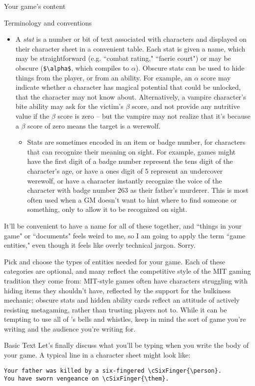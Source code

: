 \documentclass{article}
\begin{document}
\begin{section}{Your game's content}
\begin{subsection}{Terminology and conventions}
\begin{itemize}
\begin{itemize}
\end{itemize}
  \item A \textit{stat} is a number or bit of text associated with characters and displayed on their character sheet in a convenient table.  Each stat is given a name, which may be straightforward (e.g. ``combat rating," ``faerie court") or may be obscure (\lstinline{$\alpha$}, which compiles to $\alpha$).  Obscure stats can be used to hide things from the player, or from an ability.  For example, an $\alpha$ score may indicate whether a character has magical potential that could be unlocked, that the character may not know about.  Alternatively, a vampire character's bite ability may ask for the victim's $\beta$ score, and not provide any nutritive value if the $\beta$ score is zero – but the vampire may not realize that it's because a $\beta$ score of zero means the target is a werewolf.
\begin{itemize}
\item Stats are sometimes encoded in an item or badge number, for characters that can recognize their meaning on sight.  For example, games might have the first digit of a badge number represent the tens digit of the character's age, or have a ones digit of 5 represent an undercover werewolf, or have a character instantly recognize the voice of the character with badge number 263 as their father's murderer.  This is most often used when a GM doesn't want to hint where to find someone or something, only to allow it to be recognized on sight.
\end{itemize}
\end{itemize}

It'll be convenient to have a name for all of these together, and ``things in your game" or ``documents" feels weird to me, so I am going to apply the term ``game entities," even though it feels like overly technical jargon.  Sorry.

Pick and choose the types of entities needed for your game.  Each of these categories are optional, and many reflect the competitive style of the MIT gaming tradition they come from: MIT-style games often have characters struggling with hiding items they shouldn't have, reflected by the support for the bulkiness mechanic; obscure stats and hidden ability cards reflect an attitude of actively resisting metagaming, rather than trusting players not to.  While it can be tempting to use all of \gametex{}'s bells and whistles, keep in mind the sort of game you're writing and the audience you're writing for.
\end{subsection}
\begin{subsection}{Basic \gametex{} Text}
Let's finally discuss what you'll be typing when you write the body of your game.
A typical line in a \gametex{} character sheet might look like:
\begin{verbatim}
Your father was killed by a six-fingered \cSixFinger{\person}.  
You have sworn vengeance on \cSixFinger{\them}.
\end{verbatim}


\end{subsection}
\end{section}
\end{document}
